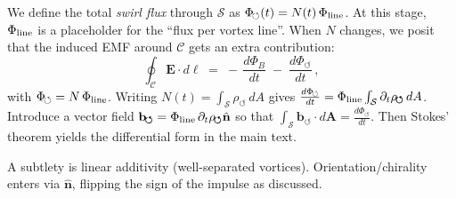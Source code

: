 \documentclass[12pt]{article}
\begin{document}
    We define the total \emph{swirl flux} through $\mathcal{S}$ as $\Phi_{\!\circlearrowleft}(t) = N(t)\,\Phi_{\rm line}$. At this stage, $\Phi_{\rm line}$ is a placeholder for the ``flux per vortex line''. When $N$ changes, we posit that the induced EMF around $\mathcal{C}$ gets an extra contribution:
    \begin{equation}\label{eq:app-faraday-mod-int}
    \oint_{\mathcal{C}} \mathbf{E}\cdot d\boldsymbol{\ell} \;=\; -\,\frac{d\Phi_{B}}{dt} \;-\; \frac{d\Phi_{\!\circlearrowleft}}{dt}\,,
    \end{equation}
    with $\Phi_{\!\circlearrowleft} = N\,\Phi_{\rm line}$. Writing $N(t)=\int_{\mathcal{S}}\rho_{\!\boldsymbol{\circlearrowleft}}\,dA$ gives $\frac{d\Phi_{\!\circlearrowleft}}{dt}=\Phi_{\rm line}\int_{\mathcal S}\partial_t\rho_{\!\boldsymbol{\circlearrowleft}}\,dA$. Introduce a vector field $\mathbf{b}_{\!\boldsymbol{\circlearrowleft}}=\Phi_{\rm line}\,\partial_t\rho_{\!\boldsymbol{\circlearrowleft}}\hat{\mathbf n}$ so that $\int_{\mathcal S}\mathbf{b}_{\!\boldsymbol{\circlearrowleft}}\!\cdot d\mathbf A=\frac{d\Phi_{\!\circlearrowleft}}{dt}$. Then Stokes' theorem yields the differential form in the main text.

    A subtlety is linear additivity (well-separated vortices). Orientation/chirality enters via $\hat{\mathbf n}$, flipping the sign of the impulse as discussed.
\end{document}
